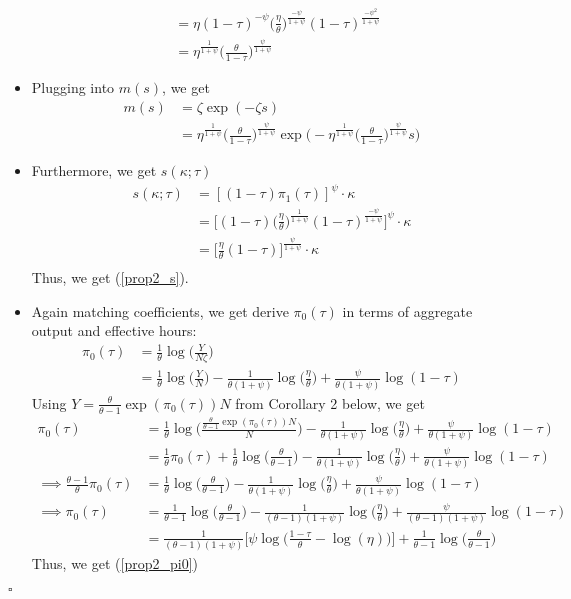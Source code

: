 \documentclass{article}
\begin{document}
\begin{itemize}
\begin{align*}
&= \eta (1-\tau)^{-\psi} \Bigg(\frac{\eta}{\theta}\Bigg)^{\frac{-\psi}{1+\psi}} (1-\tau)^{\frac{-\psi^2}{1+\psi}}\\
&= \eta^{\frac{1}{1+\psi}} \Bigg(\frac{\theta}{1- \tau}\Bigg)^{\frac{\psi}{1+\psi}}
\end{align*}
\item Plugging into $m(s)$, we get
\begin{align*}
m(s) 
&= \zeta \exp(-\zeta s)\\
&= \eta^{\frac{1}{1+\psi}} \Bigg(\frac{\theta}{1- \tau}\Bigg)^{\frac{\psi}{1+\psi}} \exp \Bigg(-\eta^{\frac{1}{1+\psi}} \Bigg(\frac{\theta}{1- \tau}\Bigg)^{\frac{\psi}{1+\psi}} s\Bigg)
\end{align*}
\item Furthermore, we get $s(\kappa; \tau)$
\begin{align*}
s(\kappa; \tau) 
&= [(1-\tau) \pi_1(\tau)]^{\psi} \cdot \kappa\\
&= \Bigg[(1-\tau) \Bigg(\frac{\eta}{\theta}\Bigg)^{\frac{1}{1+\psi}} (1-\tau)^{\frac{-\psi}{1+\psi}}\Bigg]^{\psi} \cdot \kappa\\
&= \Bigg[\frac{\eta}{\theta} (1-\tau)\Bigg]^{\frac{\psi}{1+\psi}} \cdot \kappa\\
\end{align*}
Thus, we get (\ref{prop2_s}).
\item Again matching coefficients, we get derive $\pi_0(\tau)$ in terms of aggregate output and effective hours:
\begin{align*}
\pi_0(\tau) 
&= \frac{1}{\theta} \log\Bigg(\frac{Y}{N\zeta}\Bigg)\\
&= \frac{1}{\theta} \log\Bigg(\frac{Y}{N}\Bigg) - \frac{1}{\theta(1+\psi)} \log\Bigg(\frac{\eta}{\theta}\Bigg) + \frac{\psi}{\theta(1+\psi)} \log(1-\tau)
\end{align*}
Using $Y = \frac{\theta}{\theta - 1} \exp(\pi_0(\tau)) N$ from Corollary 2 below, we get
\begin{align*}
\pi_0(\tau) 
&= \frac{1}{\theta} \log\Bigg(\frac{\frac{\theta}{\theta - 1} \exp(\pi_0(\tau)) N}{N}\Bigg) - \frac{1}{\theta(1+\psi)} \log\Bigg(\frac{\eta}{\theta}\Bigg) + \frac{\psi}{\theta(1+\psi)} \log(1-\tau) \\
&= \frac{1}{\theta} \pi_0(\tau) + \frac{1}{\theta}\log\Bigg(\frac{\theta}{\theta - 1} \Bigg) - \frac{1}{\theta(1+\psi)} \log\Bigg(\frac{\eta}{\theta}\Bigg) + \frac{\psi}{\theta(1+\psi)} \log(1-\tau)\\
\implies
\frac{\theta - 1}{\theta} \pi_0(\tau) 
&=\frac{1}{\theta}\log\Bigg(\frac{\theta}{\theta - 1} \Bigg) - \frac{1}{\theta(1+\psi)} \log\Bigg(\frac{\eta}{\theta}\Bigg) + \frac{\psi}{\theta(1+\psi)} \log(1-\tau)\\
\implies
\pi_0(\tau) 
&=\frac{1}{\theta-1}\log\Bigg(\frac{\theta}{\theta - 1} \Bigg) - \frac{1}{(\theta-1)(1+\psi)} \log\Bigg(\frac{\eta}{\theta}\Bigg) + \frac{\psi}{(\theta-1)(1+\psi)} \log(1-\tau)\\
&=\frac{1}{(\theta- 1)(1+\psi)}\Bigg[\psi \log\Bigg(\frac{1-\tau}{\theta} - \log (\eta) \Bigg)\Bigg] + \frac{1}{\theta - 1}\log\Bigg(\frac{\theta}{\theta-1}\Bigg)
\end{align*}
Thus, we get (\ref{prop2_pi0})
\end{itemize}
$\square$
\end{document}
